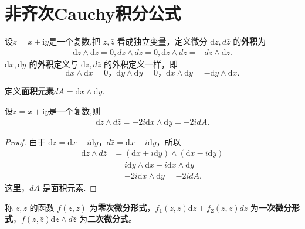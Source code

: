 \documentclass[../../main.tex]{subfiles}
\begin{document}
\section{非齐次Cauchy积分公式}

\begin{definition}
设$z=x+\mathrm{i}y$是一个复数,把 \( z,\bar{z} \) 看成独立变量，定义微分 \( \mathrm{d}z,d\bar{z} \) 的\textbf{外积}为
\begin{align*}
\mathrm{d}z \wedge \mathrm{d}z = 0, 
d\bar{z} \wedge d\bar{z} = 0, 
\mathrm{d}z \wedge d\bar{z} = -d\bar{z} \wedge \mathrm{d}z.
\end{align*}
\( \mathrm{d}x,\mathrm{d}y \) 的\textbf{外积}定义与 \( \mathrm{d}z,d\bar{z} \) 的外积定义一样，即 
\[
\mathrm{d}x \wedge \mathrm{d}x = 0 ， \mathrm{d}y \wedge \mathrm{d}y = 0 ， \mathrm{d}x \wedge \mathrm{d}y = -\mathrm{d}y \wedge \mathrm{d}x .
\]

定义\textbf{面积元素}\( dA =\mathrm{d}x \wedge \mathrm{d}y .\) 
\end{definition}

\begin{proposition}
设$z=x+\mathrm{i}y$是一个复数,则
\begin{align*}
\mathrm{d}z \wedge d\bar{z} = -2i\mathrm{d}x \wedge \mathrm{d}y = -2idA.
\end{align*}
\end{proposition}
\begin{proof}
由于 \( \mathrm{d}z = \mathrm{d}x + i\mathrm{d}y \)，\( d\bar{z} = \mathrm{d}x - i\mathrm{d}y \)，所以
\begin{align*}
\mathrm{d}z \wedge d\bar{z} &= (\mathrm{d}x + i\mathrm{d}y) \wedge (\mathrm{d}x - i\mathrm{d}y) \\
&= i\mathrm{d}y \wedge \mathrm{d}x - i\mathrm{d}x \wedge \mathrm{d}y \\
&= -2i\mathrm{d}x \wedge \mathrm{d}y = -2idA.
\end{align*}
这里，\( dA \) 是面积元素.
\end{proof}

\begin{definition}
称 \( z,\bar{z} \) 的函数 \( f(z,\bar{z}) \) 为\textbf{零次微分形式}，\( f_1(z,\bar{z})\mathrm{d}z + f_2(z,\bar{z})d\bar{z} \) 为\textbf{一次微分形式}，\( f(z,\bar{z})\mathrm{d}z \wedge d\bar{z} \) 为\textbf{二次微分式}。
\end{definition}
\end{document}
